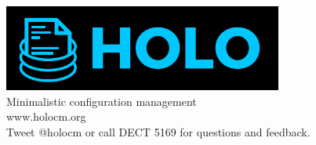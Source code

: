 \documentclass[aspectratio=169]{beamer}
\begin{document}
\begin{frame}[plain,c]
 \centering
 \includegraphics[width=\textwidth]{../32c3-lightning-talk/holo-logo.pdf}
 \\[0.5em]
 \LARGE Minimalistic configuration management
 \\[0.0em]
 {\color{holoonblack} www.holocm.org}
 \\[0.5em]
 \small Tweet {\color{holoonblack}@holocm} or call {\color{holoonblack}DECT 5169} for questions and feedback.
\end{frame}
\end{document}
